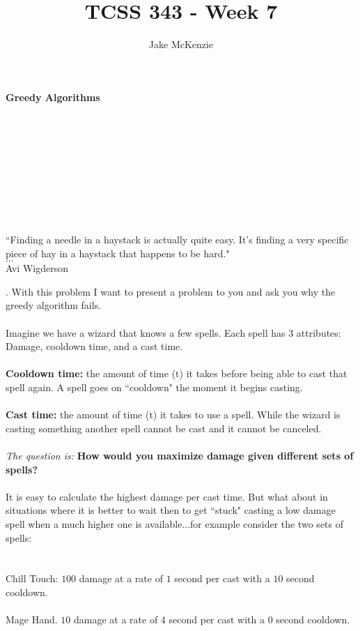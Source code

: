 \documentclass[12pt]{article}
\begin{document}
\title{TCSS 343 - Week 7}
\author{Jake McKenzie}
\maketitle
\noindent\centerline{\textbf{Greedy Algorithms}}\\\\\\\\\\\\\\\\
\begin{center}
    ``Finding a needle in a haystack is actually quite easy. It's finding a very specific piece of hay in a haystack that happens to be hard." \\$\dots$\\ Avi Wigderson
\end{center}
\newpage
{}. With this problem I want to present a 
problem to you and ask you why the greedy algorithm fails.\\\\
Imagine we have a wizard that knows a few spells. 
Each spell has 3 attributes: Damage, cooldown time, and a cast time. \\\\
\textbf{Cooldown time:} the amount of time (t) it takes 
before being able to cast that spell again. 
A spell goes on ``cooldown" the moment it begins casting.\\\\
\textbf{Cast time:} the amount of time (t) it takes 
to use a spell. While the wizard is casting 
something another spell cannot be cast and 
it cannot be canceled. \\\\
\textit{The question is:} \textbf{How would you maximize damage 
given different sets of spells?} \\\\
It is easy to calculate the highest damage per cast 
time. But what about in situations where it is better 
to wait then to get ``stuck" casting a low damage 
spell when a much higher one is available...for example consider
the two sets of spells:\\\\\\
Chill Touch: $100$ damage at a rate of $1$ second per cast with a $10$ second cooldown. \\\\
Mage Hand. $10$ damage at a rate of $4$ second per cast with a $0$ second cooldown.\\\\
\end{document}
